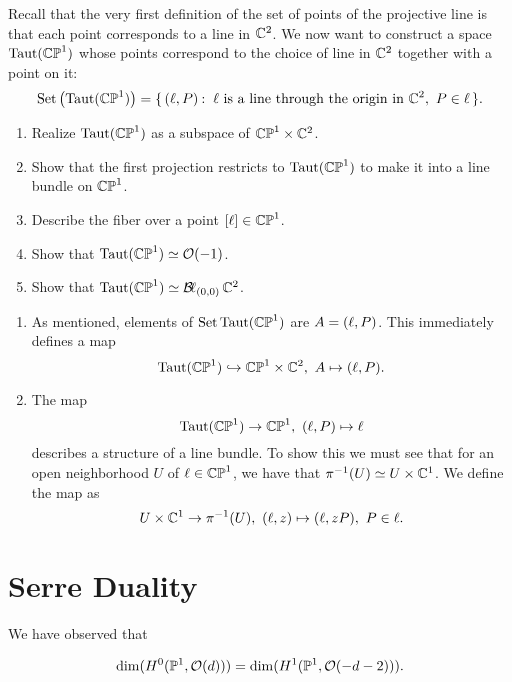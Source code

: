\documentclass[12pt]{memoir}
\begin{document}
\begin{Ej}
    Recall that the very first definition of the set of points of the projective line is that each point corresponds to a line in $\mathbb{C}^2$. We now want to construct a space $\operatorname{Taut}(\mathbb{CP}^1)$ whose points correspond to the choice of line in $\mathbb{C}^2$ together with a point on it:
    $$\text{Set}\left(\Taut(\bCP^1)\right)=\set{(\l,P)\:\ \l\text{ is a line through the origin in }\bC^2,\ P\in\l}.$$
    \begin{enumerate}
        \item Realize $\operatorname{Taut}(\mathbb{CP}^1)$ as a subspace of $\mathbb{CP}^1\times\mathbb{C}^2$.
        \item Show that the first projection restricts to $\operatorname{Taut}(\mathbb{CP}^1)$ to make it into a line bundle on $\mathbb{CP}^1$.
        \item Describe the fiber over a point $[\ell]\in\mathbb{CP}^1$.
        \item Show that $\operatorname{Taut}(\mathbb{CP}^1)\simeq \mathcal{O}(-1)$.
        \item Show that $\operatorname{Taut}(\mathbb{CP}^1)\simeq \operatorname{\mathcal{B}\!\ell}_{(0,0)}\mathbb{C}^2$.
    \end{enumerate}
\end{Ej}

\begin{ptcbr}
    \begin{enumerate}
        \item As mentioned, elements of $\text{Set}\operatorname{Taut}(\mathbb{CP}^1)$ are $A=(\ell,P)$. This immediately defines a map 
        $$\Taut(\bCP^1)\hookto\bCP^1\x\bC^2,\ A\mapsto (\l,P).$$
        \item The map 
        $$\Taut(\bCP^1)\to\bCP^1,\ (\l,P)\mapsto \l$$
        describes a structure of a line bundle. To show this we must see that for an open neighborhood $U$ of $\ell\in\mathbb{CP}^1$, we have that $\pi^{-1}(U)\simeq U\times\mathbb{C}^1$. We define the map as 
        $$U\x\bC^1\to\pi^{-1}(U),\ (\l,z)\mapsto(\l,zP),\ P\in\l.$$
    \end{enumerate}
\end{ptcbr}

\section{Serre Duality}

We have observed that 

$$\dim(H^0(\mathbb{P}^1,\mathcal{O}(d)))=\dim(H^1(\mathbb{P}^1,\mathcal{O}(-d-2))).$$
\end{document}
